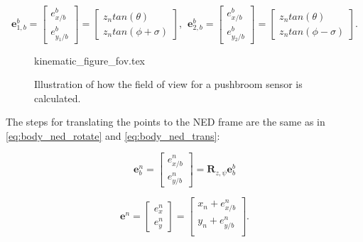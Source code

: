 \begin{equation}
	\bm{e}_{1,b}^b = 
	\begin{bmatrix}
		e^b_{x/b} \\ e^b_{y_1/b}
	\end{bmatrix}
	=
	\begin{bmatrix}
		z_n tan(\theta)\\
		z_n tan(\phi + \sigma)
	\end{bmatrix}
	, \hspace{5pt}
	\bm{e}_{2,b}^b = 
	\begin{bmatrix}
		e^b_{x/b} \\ e^b_{y_2/b}
	\end{bmatrix}
	=
	\begin{bmatrix}
		z_n tan(\theta)\\
		z_n tan(\phi - \sigma)
	\end{bmatrix}.
\end{equation}

\begin{figure}
	{kinematic_figure_fov.tex}
	\caption{Illustration of how the field of view for a pushbroom sensor is calculated.}
	\label{fig:camera_kinematics_fov}
\end{figure}

The steps for translating the points to the NED frame are the same as in \eqref{eq:body_ned_rotate} and \eqref{eq:body_ned_trans}:

\begin{equation}
	\bm{e}_b^n =
	\begin{bmatrix}
		e^n_{x/b} \\ e^n_{y/b}
	\end{bmatrix}
	= \bm{R}_{z,\psi} \bm{e}_b^b
\end{equation}

\begin{equation}
	\bm{e}^n =
	\begin{bmatrix}
		e^n_{x} \\ e^n_{y}
	\end{bmatrix}
	=
	\begin{bmatrix}
		x_n + e^n_{x/b} \\
		y_n + e^n_{y/b} \\
	\end{bmatrix}.
\end{equation}

